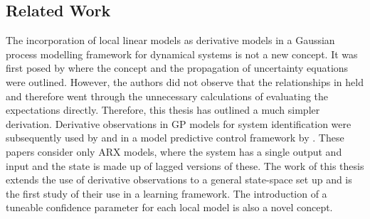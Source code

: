 \subsection{Related Work}
The incorporation of local linear models as derivative models in a Gaussian process modelling framework for dynamical systems is not a new concept. It was first posed by \cite{KGL03} where the concept and the propagation of uncertainty equations were outlined. However, the authors did not observe that the relationships in  held and therefore went through the unnecessary calculations of evaluating the expectations directly. Therefore, this thesis has outlined a much simpler derivation. Derivative observations in GP models for system identification were subsequently used by \cite{AK11} and in a model predictive control framework by \cite{AK08}. These papers consider only ARX models, where the system has a single output and input and the state is made up of lagged versions of these. The work of this thesis extends the use of derivative observations to a general state-space set up and is the first study of their use in a learning framework. The introduction of a tuneable confidence parameter for each local model is also a novel concept.